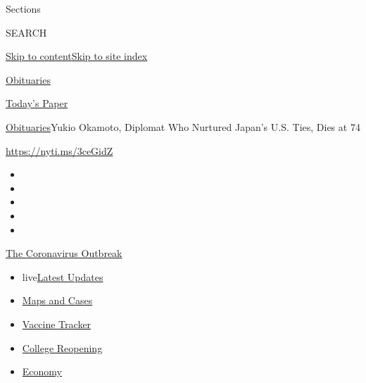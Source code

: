Sections

SEARCH

\protect\hyperlink{site-content}{Skip to
content}\protect\hyperlink{site-index}{Skip to site index}

\href{https://www.nytimes3xbfgragh.onion/section/obituaries}{Obituaries}

\href{https://myaccount.nytimes3xbfgragh.onion/auth/login?response_type=cookie\&client_id=vi}{}

\href{https://www.nytimes3xbfgragh.onion/section/todayspaper}{Today's
Paper}

\href{/section/obituaries}{Obituaries}\textbar{}Yukio Okamoto, Diplomat
Who Nurtured Japan's U.S. Ties, Dies at 74

\url{https://nyti.ms/3ceGidZ}

\begin{itemize}
\item
\item
\item
\item
\item
\end{itemize}

\href{https://www.nytimes3xbfgragh.onion/news-event/coronavirus?action=click\&pgtype=Article\&state=default\&region=TOP_BANNER\&context=storylines_menu}{The
Coronavirus Outbreak}

\begin{itemize}
\tightlist
\item
  live\href{https://www.nytimes3xbfgragh.onion/2020/08/04/world/coronavirus-covid-19.html?action=click\&pgtype=Article\&state=default\&region=TOP_BANNER\&context=storylines_menu}{Latest
  Updates}
\item
  \href{https://www.nytimes3xbfgragh.onion/interactive/2020/us/coronavirus-us-cases.html?action=click\&pgtype=Article\&state=default\&region=TOP_BANNER\&context=storylines_menu}{Maps
  and Cases}
\item
  \href{https://www.nytimes3xbfgragh.onion/interactive/2020/science/coronavirus-vaccine-tracker.html?action=click\&pgtype=Article\&state=default\&region=TOP_BANNER\&context=storylines_menu}{Vaccine
  Tracker}
\item
  \href{https://www.nytimes3xbfgragh.onion/2020/08/02/us/covid-college-reopening.html?action=click\&pgtype=Article\&state=default\&region=TOP_BANNER\&context=storylines_menu}{College
  Reopening}
\item
  \href{https://www.nytimes3xbfgragh.onion/live/2020/08/03/business/stock-market-today-coronavirus?action=click\&pgtype=Article\&state=default\&region=TOP_BANNER\&context=storylines_menu}{Economy}
\end{itemize}

